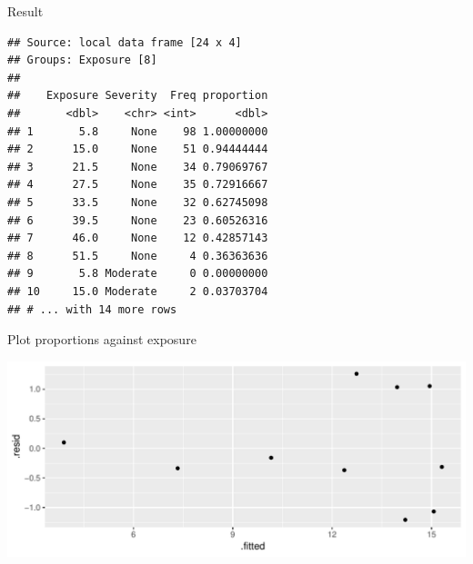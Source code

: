 \begin{frame}[fragile]{Result}
  
  \begin{footnotesize}
\begin{knitrout}
\color{fgcolor}\begin{kframe}
\begin{alltt}
\end{alltt}
\begin{verbatim}
## Source: local data frame [24 x 4]
## Groups: Exposure [8]
## 
##    Exposure Severity  Freq proportion
##       <dbl>    <chr> <int>      <dbl>
## 1       5.8     None    98 1.00000000
## 2      15.0     None    51 0.94444444
## 3      21.5     None    34 0.79069767
## 4      27.5     None    35 0.72916667
## 5      33.5     None    32 0.62745098
## 6      39.5     None    23 0.60526316
## 7      46.0     None    12 0.42857143
## 8      51.5     None     4 0.36363636
## 9       5.8 Moderate     0 0.00000000
## 10     15.0 Moderate     2 0.03703704
## # ... with 14 more rows
\end{verbatim}
\end{kframe}
\end{knitrout}
  \end{footnotesize}
  
\end{frame}

\begin{frame}[fragile]{Plot proportions against exposure}
  
\begin{knitrout}
\color{fgcolor}\begin{kframe}
\begin{alltt}
\hlstd{(}
    \hlopt{+}
  \hlstd{()}\hlopt{+}\hlstd{()}
\end{alltt}
\end{kframe}
\includegraphics[width=\maxwidth]{figure/unnamed-chunk-19-1} 

\end{knitrout}
  
\end{frame}

